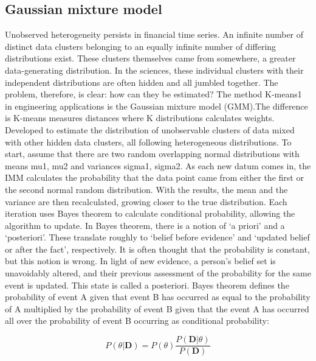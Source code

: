 \documentclass[12pt, letterpaper]{article}
\begin{document}
	\subsection{Gaussian mixture model}
Unobserved heterogeneity persists in financial time series. An infinite number of distinct data clusters belonging to an equally infinite number of differing distributions exist. These clusters themselves came from somewhere, a greater data-generating distribution. In the sciences, these individual clusters with their independent distributions are often hidden and all jumbled together. The problem, therefore, is clear: how can they be estimated? The method K-means1 in engineering applications is the Gaussian mixture model (GMM).The difference is K-means measures distances where K distributions calculates weights. Developed to estimate the distribution of unobservable clusters of data mixed with other hidden data clusters, all following heterogeneous distributions. To start, assume that there are two random overlapping normal distributions with means mu1, mu2 and variances sigma1, sigma2. As each new datum comes in, the IMM calculates the probability that the data point came from either the first or the second normal random distribution. With the results, the mean and the variance are then recalculated, growing closer to the true distribution. Each iteration uses Bayes theorem to calculate conditional probability, allowing the algorithm to update. 
	In Bayes theorem, there is a notion of ‘a priori’ and a ‘posteriori’. These translate roughly to ‘belief before evidence’ and ‘updated belief or after the fact’, respectively. It is often thought that the probability is constant, but this notion is wrong. In light of new evidence, a person’s belief set is unavoidably altered, and their previous assessment of the probability for the same event is updated. This state is called a posteriori. Bayes theorem defines the probability of event A given that event B has occurred as equal to the probability of A multiplied by the probability of event B given that the event A has occurred all over the probability of event B occurring as conditional probability:
		
	\begin{equation}
	\label{eq:bayes}
	P(\theta|\textbf{D}) = P(\theta ) \frac{P(\textbf{D} |\theta)}{P(\textbf{D})} 
	\end{equation}
\end{document}
